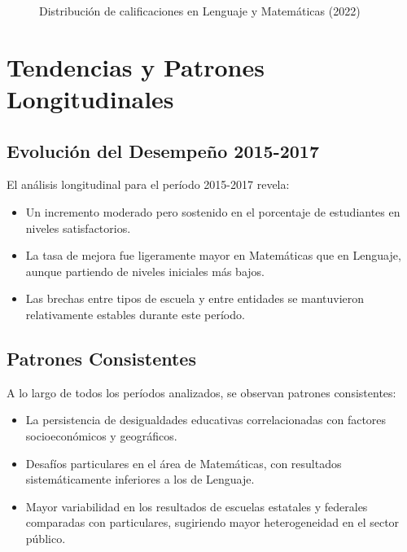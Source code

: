 \begin{figure}[h]
    \centering
    \caption{Distribución de calificaciones en Lenguaje y Matemáticas (2022)}
    \label{fig:histograma_2022}
\end{figure}

\section{Tendencias y Patrones Longitudinales}

\subsection{Evolución del Desempeño 2015-2017}
El análisis longitudinal para el período 2015-2017 revela:

\begin{itemize}
    \item Un incremento moderado pero sostenido en el porcentaje de estudiantes en niveles satisfactorios.
    
    \item La tasa de mejora fue ligeramente mayor en Matemáticas que en Lenguaje, aunque partiendo de niveles iniciales más bajos.
    
    \item Las brechas entre tipos de escuela y entre entidades se mantuvieron relativamente estables durante este período.
\end{itemize}

\subsection{Patrones Consistentes}
A lo largo de todos los períodos analizados, se observan patrones consistentes:

\begin{itemize}
    \item La persistencia de desigualdades educativas correlacionadas con factores socioeconómicos y geográficos.
    
    \item Desafíos particulares en el área de Matemáticas, con resultados sistemáticamente inferiores a los de Lenguaje.
    
    \item Mayor variabilidad en los resultados de escuelas estatales y federales comparadas con particulares, sugiriendo mayor heterogeneidad en el sector público.
\end{itemize}

